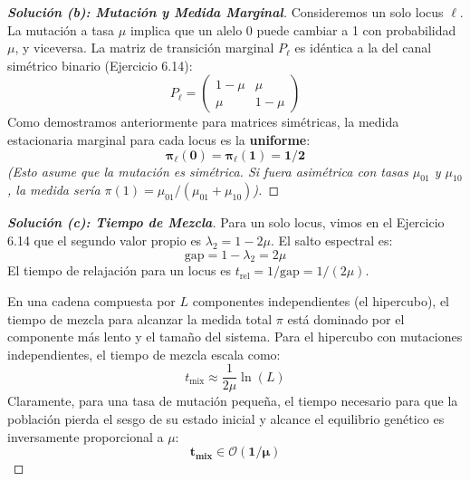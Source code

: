 \documentclass[10pt,a4paper]{article}
\begin{document}
\vspace{5mm}

\begin{proof}[\textbf{Solución (b): Mutación y Medida Marginal}]
    Consideremos un solo locus $\ell$. La mutación a tasa $\mu$ implica que un alelo 0 puede cambiar a 1 con probabilidad $\mu$, y viceversa. La matriz de transición marginal $P_\ell$ es idéntica a la del canal simétrico binario (Ejercicio 6.14):
    \[ P_\ell = \begin{pmatrix} 1-\mu & \mu \\ \mu & 1-\mu \end{pmatrix} \]
    Como demostramos anteriormente para matrices simétricas, la medida estacionaria marginal para cada locus es la \textbf{uniforme}:
    \[ \mathbf{\pi_\ell(0) = \pi_\ell(1) = 1/2} \]
    \textit{(Esto asume que la mutación es simétrica. Si fuera asimétrica con tasas $\mu_{01}$ y $\mu_{10}$, la medida sería $\pi(1) = \mu_{01}/(\mu_{01}+\mu_{10})$).}
\end{proof}

\vspace{5mm}

\begin{proof}[\textbf{Solución (c): Tiempo de Mezcla}]
    Para un solo locus, vimos en el Ejercicio 6.14 que el segundo valor propio es $\lambda_2 = 1 - 2\mu$. El salto espectral es:
    \[ \text{gap} = 1 - \lambda_2 = 2\mu \]
    El tiempo de relajación para un locus es $t_{\text{rel}} = 1/\text{gap} = 1/(2\mu)$.
    
    En una cadena compuesta por $L$ componentes independientes (el hipercubo), el tiempo de mezcla para alcanzar la medida total $\pi$ está dominado por el componente más lento y el tamaño del sistema. Para el hipercubo con mutaciones independientes, el tiempo de mezcla escala como:
    \[ t_{\text{mix}} \approx \frac{1}{2\mu} \ln(L) \]
    Claramente, para una tasa de mutación pequeña, el tiempo necesario para que la población pierda el sesgo de su estado inicial y alcance el equilibrio genético es inversamente proporcional a $\mu$:
    \[ \mathbf{t_{\text{mix}} \in \mathcal{O}(1/\mu)} \]
\end{proof}

\vspace{5mm}
\end{document}
